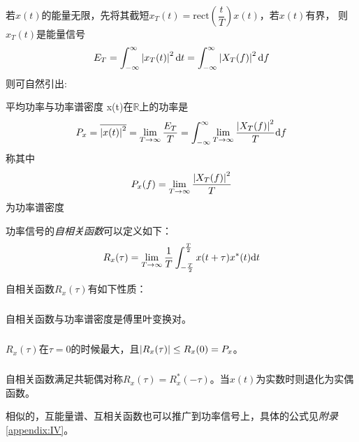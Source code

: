     若$x(t)$的能量无限，先将其截短$x_T(t)=\text{rect}(\dfrac{t}{T})x(t)$，若$x(t)$有界，
    则$x_T(t)$是能量信号
    \begin{equation}
        E_T=\int_{-\infty}^{\infty}\left\vert x_T(t) \right\vert^2\text{\upshape d} t=\int_{-\infty}^{\infty}\left\vert X_T(f) \right\vert^2\text{\upshape d} f
    \end{equation}
    则可自然引出:
    \begin{mydef}{平均功率与功率谱密度}
        x(t)在$\mathbb{R}$上的功率是
        \begin{equation}
            P_x=\overline{\left\vert x(t) \right\vert^2}=\lim_{T\to\infty}\frac{E_T}{T}=\int_{-\infty}^{\infty}\lim_{T\to\infty}\frac{\left\vert X_T(f) \right\vert^2}{T}\text{\upshape d} f
        \end{equation}
        称其中
        \begin{equation}
            P_x(f)=\lim_{T\to\infty}\frac{\left\vert X_T(f) \right\vert^2}{T}
        \end{equation}
        为功率谱密度
    \end{mydef}

    功率信号的\emph{自相关函数}可以定义如下：
    \begin{equation}
        R_x(\tau)=\lim_{T\to\infty}\frac{1}{T}\int_{-\frac{T}{2}}^{\frac{T}{2}}x(t+\tau)x^*(t)\text{\upshape d} t
    \end{equation}

    自相关函数$R_x(\tau)$有如下性质：
    \subparagraph{\hspace{-1em}}自相关函数与功率谱密度是傅里叶变换对。

    \subparagraph{\hspace{-1em}}$R_x(\tau)$在$\tau=0$的时候最大，且$\left\vert R_x(\tau) \right\vert\leq R_x(0)=P_x$。

    \subparagraph{\hspace{-1em}}自相关函数满足共轭偶对称$R_x(\tau)=R^*_x(-\tau)$。当$x(t)$为实数时则退化为实偶函数。

    相似的，互能量谱、互相关函数也可以推广到功率信号上，具体的公式见\emph{附录}\ref{appendix:IV}。

